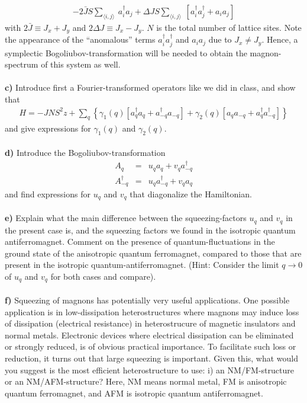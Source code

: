 \begin{problem}
\begin{eqnarray}
	- 2 \bar{J} S  \sum_{\langle i,j \rangle} ~  a^{\dagger}_i a_j 
	+ \Delta J S \sum_{\langle i,j \rangle} ~  \left[  a^{\dagger}_i a^{\dagger}_j +  a_i a_j \right] \nonumber 
\end{eqnarray}
with $2 \bar{J} \equiv J_x+J_y$ and $2  \Delta J \equiv J_x-J_y$. $N$ is the total number of lattice sites. Note the appearance of the ``anomalous'' terms 
$a^{\dagger}_i a^{\dagger}_j $ and $a_i a_j$ due to 
$J_x \neq J_y$.  Hence, a symplectic Bogoliubov-transformation will be needed to obtain the magnon-spectrum of this system as well. 
\ \\
\ \\
{\bf c)} Introduce first a Fourier-transformed operators like we did in class, and show that 
\begin{eqnarray}
	H = -J N S^2 z + \sum_{q}\left\{  \gamma_1(q) \left[ a^{\dagger}_q a_q + a^{\dagger}_{-q} a_{-q}  \right] +  \gamma_2(q) \left[ a_q a_{-q} + a^{\dagger}_{q} a^{\dagger}_{-q}  \right]\right\} \nonumber 
\end{eqnarray}
and give expressions for $\gamma_1(q)$ and $\gamma_2(q)$.
\ \\
\ \\
{\bf d)} Introduce the Bogoliubov-transformation
\begin{eqnarray}
	A_{q} & = & u_q a_q + v_q a^{\dagger}_{-q}  \nonumber \\
	A^{\dagger}_{-q} & = & u_q a^{\dagger}_{-q} + v_q a_{q}  \nonumber
\end{eqnarray}
and find expressions for $u_q$ and $v_q$ that diagonalize the Hamiltonian. 
\ \\
\ \\
{\bf e)} Explain what the main difference between the squeezing-factors  $u_q$ and $v_q$ in the present case is, and the squeezing factors we found in the isotropic quantum antiferromagnet.  Comment on the presence of quantum-fluctuations in the ground state of the anisotropic quantum ferromagnet, compared to those that are present in the isotropic quantum-antiferromagnet. (Hint: Consider the limit $q \to 0$ of $u_q$ and $v_q$ for both cases
and compare). 
\ \\
\ \\
{\bf f)} Squeezing of magnons has potentially very useful applications. One possible application is in low-dissipation heterostructures where magnons may induce loss of dissipation (electrical resistance) in heterostrucure of magnetic insulators and normal metals.  Electronic devices where electrical dissipation can be eliminated or strongly reduced, is of obvious practical importance. To facilitate such loss or reduction, it turns out that large squeezing is important. Given this, what would you suggest is the most efficient heterostructure to use: i) an NM/FM-structure or an NM/AFM-structure? Here, NM means normal metal, FM is anisotropic quantum ferromagnet, and AFM is isotropic quantum antiferromagnet.    
\end{problem}


